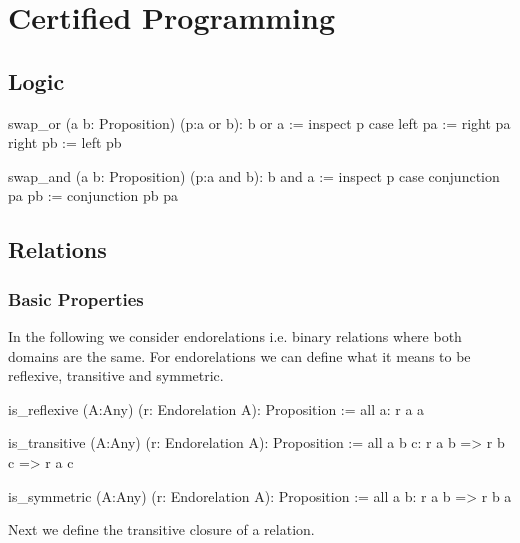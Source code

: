 
\chapter{Certified Programming}
\label{chap:certprog}





\newpage
\section{Logic}
\label{sec:certprog-logic}


\begin{alba}
  swap_or (a b: Proposition) (p:a or b): b or a :=
    inspect
      p
    case
      left  pa := right pa
      right pb := left  pb
\end{alba}



\begin{alba}
  swap_and (a b: Proposition) (p:a and b): b and a :=
    inspect
      p
    case
      conjunction pa pb :=
        conjunction pb pa
\end{alba}










\newpage
\section{Relations}
\label{sec:certprog-relations}


\subsection{Basic Properties}


In the following we consider endorelations i.e. binary relations where both
domains are the same. For endorelations we can define what it means to be
reflexive, transitive and symmetric.

\begin{alba}
  is_reflexive (A:Any) (r: Endorelation A): Proposition :=
    all a: r a a

  is_transitive (A:Any) (r: Endorelation A): Proposition :=
    all a b c: r a b => r b c => r a c

  is_symmetric (A:Any) (r: Endorelation A): Proposition :=
    all a b: r a b => r b a
\end{alba}


Next we define the transitive closure of a relation.

